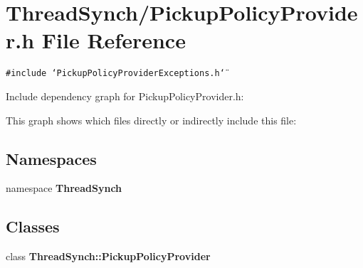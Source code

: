 \section{Thread\-Synch/Pickup\-Policy\-Provider.h File Reference}
\label{_pickup_policy_provider_8h}
{\tt \#include \char`\"{}Pickup\-Policy\-Provider\-Exceptions.h\char`\"{}}\par


Include dependency graph for Pickup\-Policy\-Provider.h:

This graph shows which files directly or indirectly include this file:\subsection*{Namespaces}
\begin{CompactItemize}
\item 
namespace {\bf Thread\-Synch}
\end{CompactItemize}
\subsection*{Classes}
\begin{CompactItemize}
\item 
class {\bf Thread\-Synch::Pickup\-Policy\-Provider}
\end{CompactItemize}

